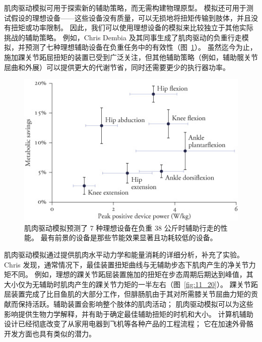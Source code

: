 肌肉驱动模拟可用于探索新的辅助策略，而无需构建物理原型。
模拟还可用于测试假设的理想设备——这些设备没有质量，可以无损地将扭矩传输到肢体，并且没有扭矩或功率限制。
因此，我们可以使用理想设备的模拟来比较独立于其他实际挑战的辅助策略。
例如，Chris Dembia 及其同事生成了肌肉驱动的负重行走模拟，并预测了七种理想辅助设备在负重任务中的有效性（图~\ref{fig:11_19}）。
虽然迄今为止，施加踝关节跖屈扭矩的装置已受到广泛关注，但其他辅助策略（例如，辅助髋关节屈曲和外展）可以提供更大的代谢节省，同时还需要更少的执行器功率。


\begin{figure}[!htb]
	\centering
	\includegraphics[width=0.8\linewidth]{chap11/11_19}
	\caption{肌肉驱动模拟预测了 7 种理想设备在负重 38 公斤时辅助行走的性能。
		最有前景的设备是那些节能效果显著且功耗较低的设备\cite{dembia2017simulating}。 \label{fig:11_19}}
\end{figure}


肌肉驱动模拟通过提供肌肉水平动力学和能量消耗的详细分析，补充了实验。
Chris 发现，通常情况下，最佳装置扭矩曲线与无辅助步态下肌肉产生的净关节力矩不同。
例如，理想的踝关节跖屈装置施加的扭矩在步态周期后期达到峰值，其大小仅为无辅助时肌肉产生的踝关节力矩的一半左右（图~\ref{fig:11_20}）。
踝关节跖屈装置完成了比目鱼肌的大部分工作，但腓肠肌由于其对所需膝关节屈曲力矩的贡献而保持活跃。辅助装置会影响整个肢体的肌肉活动；
肌肉驱动模拟可以为这些影响提供生物力学解释，并有助于确定最佳辅助扭矩的时机和大小。
计算机辅助设计已经彻底改变了从家用电器到飞机等各种产品的工程流程；
它在加速外骨骼开发方面也具有类似的潜力。


